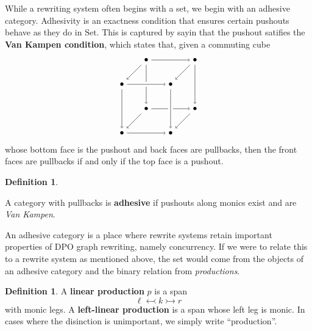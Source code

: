 \documentclass{amsart}
\newcommand{\Set}{\cat{Set}}
\newcommand{\defn}[1]{\textbf{#1}}
\newcommand{\cat}[1]{\mathrm{#1}}
\theoremstyle{remark}
\theoremstyle{definition}
\newtheorem{definition}[theorem]{Definition}
\begin{document}
While a rewriting system often begins with a set, we begin with an
adhesive category.  Adhesivity is an exactness condition that ensures
certain pushouts behave as they do in $ \Set $. This is captured by
sayin that the pushout satifies the \defn{Van Kampen condition}, which
states that, given a commuting cube
%
\[
  \begin{tikzpicture}
    \node (1) at (1,3) {\( \bullet \)};
    \node (2) at (0,2) {\( \bullet \)};
    \node (3) at (3,3) {\( \bullet \)};
    \node (4) at (2,2) {\( \bullet \)};
    \node (5) at (1,1) {\( \bullet \)};
    \node (6) at (0,0) {\( \bullet \)};
    \node (7) at (3,1) {\( \bullet \)};
    \node (8) at (2,0) {\( \bullet \)};
    \draw [->] (1) to node [] {\scriptsize{\(  \)}} (5);
    \draw [->] (1) to node [] {\scriptsize{\(  \)}} (2);
    \draw [->] (1) to node [] {\scriptsize{\(  \)}} (3);
    \draw [white, line width=2mm] (2) -- (4);
    \draw [->] (2) to node [] {\scriptsize{\(  \)}} (4);
    \draw [->] (3) to node [] {\scriptsize{\(  \)}} (4);
    \draw [->] (5) to node [] {\scriptsize{\(  \)}} (6);
    \draw [->] (5) to node [] {\scriptsize{\(  \)}} (7);
    \draw [->] (6) to node [] {\scriptsize{\(  \)}} (8);
    \draw [->] (7) to node [] {\scriptsize{\(  \)}} (8);
    \draw [->] (2) to node [] {\scriptsize{\(  \)}} (6);
    \draw [->] (3) to node [] {\scriptsize{\(  \)}} (7);
    \draw [white, line width=2mm] (4) -- (8);
    \draw [->] (4) to node [] {\scriptsize{\(  \)}} (8);
  \end{tikzpicture}
\]
% 
whose bottom face is the pushout and back faces are pullbacks, then
the front faces are pullbacks if and only if the top face is a pushout.

\begin{definition} \label{dfn:adhesive-category} 

  A category with pullbacks is \defn{adhesive} if pushouts along
  monics exist and are \emph{Van Kampen}.

\end{definition} 

An adhesive category is a place where rewrite systems
retain important properties of DPO graph rewriting, namely
concurrency.
%
%
If we were to relate this to a rewrite system as mentioned above, the
set would come from the objects of an adhesive category and the binary
relation from \emph{productions}.

\begin{definition}

  A \defn{linear production} $ p $ is a span
  \[
    \ell \leftarrowtail k \rightarrowtail r
  \]
  with monic legs.  A \defn{left-linear production} is a span whose
  left leg is monic. In cases where the disinction is unimportant, we
  simply write ``production''. 
  
\end{definition}
\end{document}
